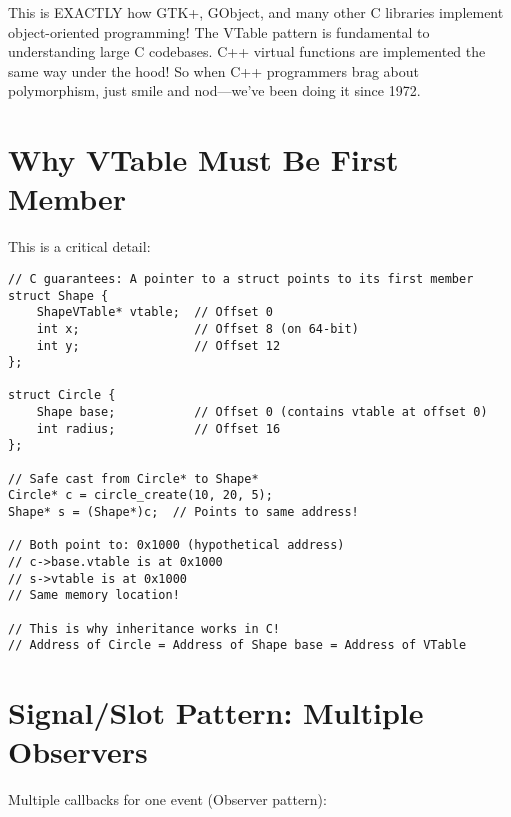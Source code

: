 \begin{notebox}
This is EXACTLY how GTK+, GObject, and many other C libraries implement object-oriented programming! The VTable pattern is fundamental to understanding large C codebases. C++ virtual functions are implemented the same way under the hood! So when C++ programmers brag about polymorphism, just smile and nod---we've been doing it since 1972.
\end{notebox}

\section{Why VTable Must Be First Member}

This is a critical detail:

\begin{lstlisting}
// C guarantees: A pointer to a struct points to its first member
struct Shape {
    ShapeVTable* vtable;  // Offset 0
    int x;                // Offset 8 (on 64-bit)
    int y;                // Offset 12
};

struct Circle {
    Shape base;           // Offset 0 (contains vtable at offset 0)
    int radius;           // Offset 16
};

// Safe cast from Circle* to Shape*
Circle* c = circle_create(10, 20, 5);
Shape* s = (Shape*)c;  // Points to same address!

// Both point to: 0x1000 (hypothetical address)
// c->base.vtable is at 0x1000
// s->vtable is at 0x1000
// Same memory location!

// This is why inheritance works in C!
// Address of Circle = Address of Shape base = Address of VTable
\end{lstlisting}

\section{Signal/Slot Pattern: Multiple Observers}

Multiple callbacks for one event (Observer pattern):

